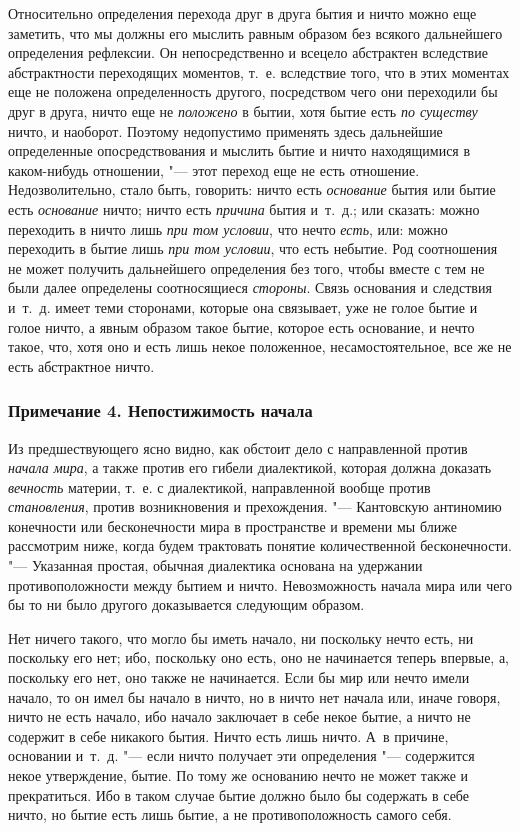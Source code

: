 Относительно определения перехода друг в друга бытия и ничто можно еще
заметить, что мы должны его мыслить равным образом без всякого дальнейшего
определения рефлексии. Он непосредственно и всецело абстрактен вследствие
абстрактности переходящих моментов, т.~е. вследствие того, что в этих
моментах еще не положена определенность другого, посредством чего они
переходили бы друг в друга, ничто еще не {\em положено}
в бытии, хотя бытие есть {\em по существу} ничто, и
наоборот. Поэтому недопустимо применять здесь дальнейшие определенные
опосредствования и мыслить бытие и ничто находящимися в каком-нибудь
отношении, "--- этот переход еще не есть отношение. Недозволительно, стало
быть, говорить: ничто есть {\em основание} бытия или
бытие есть {\em основание} ничто; ничто есть
{\em причина} бытия и~т.~д.; или сказать: можно
переходить в ничто лишь {\em при том условии}, что
нечто {\em есть}, или: можно переходить в бытие лишь
{\em при том условии}, что есть небытие. Род
соотношения не может получить дальнейшего определения без того, чтобы
вместе с тем не были далее определены соотносящиеся
{\em стороны}. Связь основания и следствия и~т.~д.
имеет теми сторонами, которые она связывает, уже не голое бытие и голое
ничто, а явным образом такое бытие, которое есть основание, и нечто такое,
что, хотя оно и есть лишь некое положенное, несамостоятельное, все же не
есть абстрактное ничто.

\subsubsection[Примечание 4. Непостижимость начала]
{Примечание 4. Непостижимость начала}

Из предшествующего ясно видно, как обстоит дело с направленной против
{\em начала мира}, а также против его гибели
диалектикой, которая должна доказать {\em вечность}
материи, т.~е. с диалектикой, направленной вообще против
{\em становления}, против возникновения и прехождения.
"--- Кантовскую антиномию конечности или бесконечности мира в пространстве и
времени мы ближе рассмотрим ниже, когда будем трактовать понятие
количественной бесконечности. "--- Указанная простая, обычная диалектика
основана на удержании противоположности между бытием и ничто. Невозможность
начала мира или чего бы то ни было другого доказывается следующим образом.

Нет ничего такого, что могло бы иметь начало, ни поскольку нечто есть, ни
поскольку его нет; ибо, поскольку оно есть, оно не начинается теперь
впервые, а, поскольку его нет, оно также не начинается. Если бы мир или
нечто имели начало, то он имел бы начало в ничто, но в ничто нет начала
или, иначе говоря, ничто не есть начало, ибо начало заключает в себе некое
бытие, а ничто не содержит в себе никакого бытия. Ничто есть лишь ничто.
А~в причине, основании и~т.~д. "--- если ничто получает эти определения
"--- содержится некое утверждение, бытие. По тому же основанию нечто не может
также и прекратиться. Ибо в таком случае бытие должно было бы содержать в
себе ничто, но бытие есть лишь бытие, а не противоположность самого себя.

